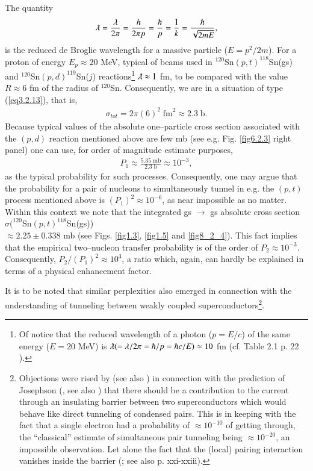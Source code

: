 The quantity
\begin{align}\label{eq3.2.16}
\lambdabar=\frac{\lambda}{2\pi}=\frac{h}{2\pi p}=\frac{\hbar}{p}=\frac{1}{k}=\frac{\hbar}{\sqrt{2mE}},
\end{align}
is the reduced de Broglie wavelength for a massive particle ($E=p^2/2m$). For a proton of energy $E_p\approx 20$ MeV, typical of beams used in $^{120}$Sn$(p,t)^{118}$Sn(gs) and $^{120}$Sn$(p,d)^{119}$Sn($j$) reactions\footnote{Of notice that the reduced wavelength of a photon ($p=E/c$) of the same energy ($E= 20$ MeV) is $\lambdabar (=\lambda/2\pi=\hbar/p=\hbar c/E)\approx 10$ fm (cf. Table 2.1 p. 22 \cite{Satchler:80}).} $\lambdabar\approx 1$ fm, to be compared with the value $R\approx 6$ fm of the radius of $^{120}$Sn. Consequently, we are in a situation of type (\ref{eq3.2.13}), that is,
\begin{align}
\sigma_{tot}=2\pi(6)^2\;\text{fm}^2\approx 2.3\;\text{b}.
\end{align}
Because typical values of the absolute one--particle cross section associated  with the $(p,d)$ reaction mentioned above are few mb (see e.g. Fig. \ref{fig6.2.3} right panel) one can use, for order of magnitude estimate purposes,  
\begin{align}
P_1\approx\frac{5.35\; \text{mb}}{2.3\;\text{b}}\approx 10^{-3},
\end{align}
as the typical probability for such processes. Consequently, one may argue that the probability for a  pair of nucleons to simultaneously tunnel in e.g. the $(p,t)$ process mentioned above is $(P_1)^2\approx10^{-6}$, as near impossible as no matter. Within this context we note that the integrated gs $\rightarrow$ gs absolute cross section $\sigma(^{120}$Sn$(p,t)^{118}$Sn(gs))\\$\approx 2.25 \pm$0.338 mb (see Figs. \ref{fig1.3}, \ref{fig1.5} and \ref{fig8_2_4}). This fact implies that the empirical two--nucleon transfer probability is of the order of $P_2\approx 10^{-3}$. Consequently, $P_2/(P_1)^2\approx 10^{3}$, a ratio which, again, can hardly be explained in terms of a physical enhancement factor.

It is to be noted that similar perplexities also emerged in connection with the understanding of tunneling between weakly coupled superconductors\footnote{Objections were rised by \cite{Bardeen:62,Bardeen:61} (see also \cite{Pippard:12,Cohen:62,McDonald:01}) in connection with the prediction of Josephson (\cite{Josephson:62}, see also \cite{Cohen:62}) that there should be a contribution to the current through an insulating barrier between two superconductors which would behave like direct tunneling of condensed pairs. This is in keeping with the fact that a single electron had a probability of $\approx 10^{-10}$ of getting through, the ``classical'' estimate of simultaneous pair tunneling being $\approx 10^{-20}$, an impossible observation. Let alone the fact that the (local) pairing interaction vanishes inside the barrier (\cite{Anderson:64b,Anderson:70}; see also \cite{Bohr:19} p. xxi-xxiii).}. 


